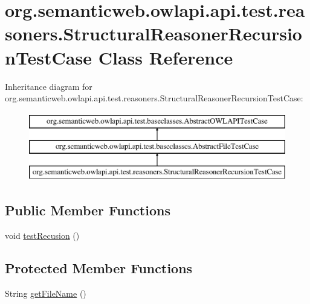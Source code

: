 \hypertarget{classorg_1_1semanticweb_1_1owlapi_1_1api_1_1test_1_1reasoners_1_1_structural_reasoner_recursion_test_case}{\section{org.\-semanticweb.\-owlapi.\-api.\-test.\-reasoners.\-Structural\-Reasoner\-Recursion\-Test\-Case Class Reference}
\label{classorg_1_1semanticweb_1_1owlapi_1_1api_1_1test_1_1reasoners_1_1_structural_reasoner_recursion_test_case}
}
Inheritance diagram for org.\-semanticweb.\-owlapi.\-api.\-test.\-reasoners.\-Structural\-Reasoner\-Recursion\-Test\-Case\-:\begin{figure}[H]
\begin{center}
\leavevmode
\includegraphics[height=3.000000cm]{classorg_1_1semanticweb_1_1owlapi_1_1api_1_1test_1_1reasoners_1_1_structural_reasoner_recursion_test_case}
\end{center}
\end{figure}
\subsection*{Public Member Functions}
\begin{DoxyCompactItemize}
\item 
void \hyperlink{classorg_1_1semanticweb_1_1owlapi_1_1api_1_1test_1_1reasoners_1_1_structural_reasoner_recursion_test_case_a17d6d2b9422c48807ba1857b422483d7}{test\-Recusion} ()
\end{DoxyCompactItemize}
\subsection*{Protected Member Functions}
\begin{DoxyCompactItemize}
\item 
String \hyperlink{classorg_1_1semanticweb_1_1owlapi_1_1api_1_1test_1_1reasoners_1_1_structural_reasoner_recursion_test_case_a165e5cb0572b9567db162352dae4d27d}{get\-File\-Name} ()
\end{DoxyCompactItemize}


